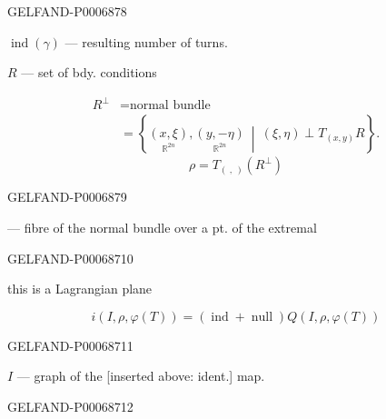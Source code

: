 \begin{GelfandAdjacentEvidence}{GELFAND-P000687}{8}


\(\operatorname{ind}(\gamma)\) --- resulting number of turns.

\(R\) --- set of bdy. conditions

\[
\begin{aligned}
R^\perp&=\text{normal bundle}\\
 &=\left\{\underset{\mathbb R^{2n}}{(x,\xi)},
        \underset{\mathbb R^{2n}}{(y,-\eta)}
      \ \middle|\ (\xi,\eta)\perp T_{(x,y)}R\right\}.
\end{aligned}
\]
\[
\rho=T_{(\ ,\ )}(R^\perp)
\]
\end{GelfandAdjacentEvidence}
\begin{GelfandAdjacentEvidence}{GELFAND-P000687}{9}

--- fibre of the normal bundle over a pt. of the extremal
\end{GelfandAdjacentEvidence}
\begin{GelfandAdjacentEvidence}{GELFAND-P000687}{10}


this is a Lagrangian plane

\[
i(I,\rho,\varphi(T))=
(\operatorname{ind}+\operatorname{null})Q(I,\rho,\varphi(T))
\]
\end{GelfandAdjacentEvidence}
\begin{GelfandAdjacentEvidence}{GELFAND-P000687}{11}


\(I\) --- graph of the [inserted above: ident.] map.
\end{GelfandAdjacentEvidence}
\begin{GelfandAdjacentEvidence}{GELFAND-P000687}{12}

\end{GelfandAdjacentEvidence}
